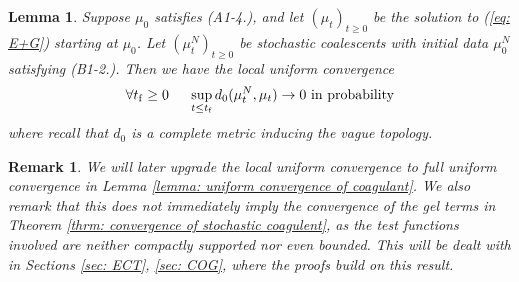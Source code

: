 \documentclass[11pt, notitlepage]{article}
\newtheorem{lem}[thm]{Lemma}
\newtheorem{rmk}[thm]{Remark}
\begin{document}
\begin{lem}\label{lemma: local uniform convergence of stochastic coagulent}
Suppose $\mu_0$ satisfies ({A1}-{4.}), and let $(\mu_t)_{t\ge 0}$ be the solution to (\ref{eq: E+G}) starting at $\mu_0$. Let $(\mu^N_t)_{t\ge 0}$ be stochastic coalescents with initial data $\mu^N_0$ satisfying (B1-2.). Then we have the local uniform convergence
\begin{equation}
\forall t_\mathrm{f}\ge 0 \hspace{0.5cm} \sup_{t\le t_\mathrm{f}} d_0(\mu^N_t, \mu_t)\rightarrow 0 \text{ in probability} 
\end{equation} where recall that $d_0$ is a complete metric inducing the vague topology.
\end{lem} \begin{rmk}
We will later upgrade the \emph{local} uniform convergence to \emph{full} uniform convergence in Lemma \ref{lemma: uniform convergence of coagulant}. We also remark that this does not immediately imply the convergence of the gel terms in Theorem \ref{thrm: convergence of stochastic coagulent}, as the test functions involved are  neither compactly supported nor even bounded. This will be dealt with in Sections \ref{sec: ECT}, \ref{sec: COG}, where the proofs build on this result.
\end{rmk}
\end{document}
